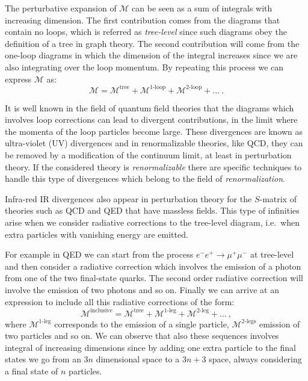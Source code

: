 \documentclass[../main/main.tex]{subfiles}
\begin{document}
The perturbative expansion of $\mathcal{M}$ can be seen as a sum of integrals with increasing dimension. The first contribution comes 
from the diagrams that contain no loops, which is referred as \emph{tree-level} since such diagrams obey the definition of a tree in graph
theory. The second contribution will come from the one-loop diagrams in which the dimension of the integral increases 
since we are also integrating over the loop momentum. By repeating this process we can express $\mathcal{M}$ as:
\begin{equation}
	\mathcal{M}=\mathcal{M}^{\text{tree}} + \mathcal{M}^{\text{1-loop}} + \mathcal{M}^{\text{2-loop}} + \dots \ .
\end{equation}

It is well known in the field of quantum field theories that the diagrams which involves loop corrections can lead to divergent contributions, in the limit where the momenta of the loop particles become large. These divergences are known as ultra-violet (UV) divergences and in renormalizable theories, like QCD, they can be removed by a modification of the continuum limit, at least in perturbation theory.
If the considered theory is \emph{renormalizable} there are specific techniques to handle this type of divergences which belong to the 
field of \emph{renormalization}.

Infra-red IR divergences also appear in perturbation theory for the $S$-matrix of theories such as QCD and QED that have massless fields.
This type of infinities arise when we consider radiative corrections to the tree-level diagram, i.e.\ when extra particles with vanishing energy are emitted.

For example in QED we can start from the process $e^- e^+ \to \mu^+ \mu^-$ at tree-level and then consider a radiative correction which 
involves the emission of a photon from one of the two final-state quarks. The second order radiative correction will involve the emission of 
two photons and so on. Finally we can arrive at an expression to include all this radiative corrections of the form:
\begin{equation}
	\mathcal{M}^{\text{inclusive}} = \mathcal{M}^{\text{tree}} + \mathcal{M}^{\text{1-leg}} + \mathcal{M}^{\text{2-leg}} + \dots \ ,
\end{equation}
where $\mathcal{M}^{\text{1-leg}}$ corresponds to the emission of a single particle,  $\mathcal{M}^{\text{2-legs}}$ emission of two
particles and so on.
We can observe that also these sequences involves integral of increasing dimensions since by adding one extra particle to the final states 
we go from an $3n$ dimensional space to a $3n + 3$ space, always considering a final state of $n$ particles.
\end{document}
